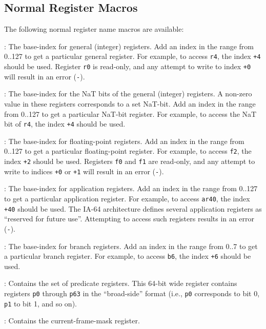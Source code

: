 \documentclass{article}
\begin{document}
\subsection{Normal Register Macros}

The following normal register name macros are available:
\begin{Description}
\item[\Const{UNW\_IA64\_GR}:] The base-index for general (integer)
  registers.  Add an index in the range from 0..127 to get a
  particular general register.  For example, to access \texttt{r4},
  the index \texttt{+4} should be used.  Register
  \texttt{r0} is read-only, and any attempt to write to index
  \texttt{+0} will result in an error
  (\texttt{-}).
\item[\Const{UNW\_IA64\_NAT}:] The base-index for the NaT bits of the
  general (integer) registers.  A non-zero value in these registers
  corresponds to a set NaT-bit.  Add an index in the range from 0..127
  to get a particular NaT-bit register.  For example, to access the
  NaT bit of \texttt{r4}, the index \texttt{+4}
  should be used.
\item[\Const{UNW\_IA64\_FR}:] The base-index for floating-point
  registers.  Add an index in the range from 0..127 to get a
  particular floating-point register.  For example, to access
  \texttt{f2}, the index \texttt{+2} should be
  used.  Registers \texttt{f0} and \texttt{f1} are read-only, and any
  attempt to write to indices \texttt{+0} or
  \texttt{+1} will result in an error
  (\texttt{-}).
\item[\Const{UNW\_IA64\_AR}:] The base-index for application
  registers.  Add an index in the range from 0..127 to get a
  particular application register.  For example, to access
  \texttt{ar40}, the index \texttt{+40} should be
  used.  The IA-64 architecture defines several application registers
  as ``reserved for future use''.  Attempting to access such registers
  results in an error (\texttt{-}).
\item[\Const{UNW\_IA64\_BR}:] The base-index for branch registers.
  Add an index in the range from 0..7 to get a particular branch
  register.  For example, to access \texttt{b6}, the index
  \texttt{+6} should be used.
\item[\Const{UNW\_IA64\_PR}:] Contains the set of predicate registers.
  This 64-bit wide register contains registers \texttt{p0} through
  \texttt{p63} in the ``broad-side'' format (i.e., \texttt{p0}
  corresponds to bit 0, \texttt{p1} to bit 1, and so on).
\item[\Const{UNW\_IA64\_CFM}:] Contains the current-frame-mask
  register.
\end{Description}
\end{document}
